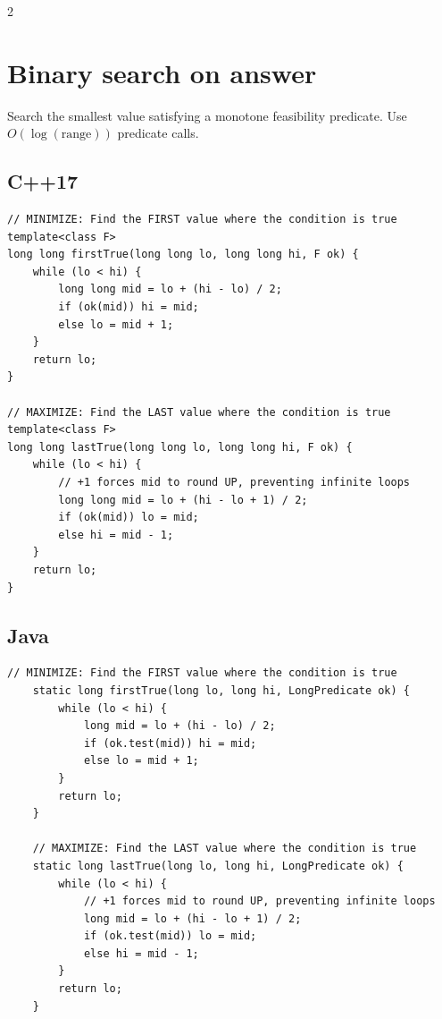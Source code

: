 \documentclass[10pt]{article}
\begin{document}
\begin{multicols}{2}

\section{Binary search on answer}
Search the smallest value satisfying a monotone feasibility predicate.
Use $O(\log(\mathrm{range}))$ predicate calls.

\subsection{C++17}
\begin{framed}
\scriptsize
\begin{verbatim}
// MINIMIZE: Find the FIRST value where the condition is true
template<class F>
long long firstTrue(long long lo, long long hi, F ok) {
    while (lo < hi) {
        long long mid = lo + (hi - lo) / 2;
        if (ok(mid)) hi = mid;
        else lo = mid + 1;
    }
    return lo;
}

// MAXIMIZE: Find the LAST value where the condition is true
template<class F>
long long lastTrue(long long lo, long long hi, F ok) {
    while (lo < hi) {
        // +1 forces mid to round UP, preventing infinite loops
        long long mid = lo + (hi - lo + 1) / 2;
        if (ok(mid)) lo = mid;
        else hi = mid - 1;
    }
    return lo;
}
\end{verbatim}
\end{framed}

\subsection{Java}
\begin{framed}
\scriptsize
\begin{verbatim}
// MINIMIZE: Find the FIRST value where the condition is true
    static long firstTrue(long lo, long hi, LongPredicate ok) {
        while (lo < hi) {
            long mid = lo + (hi - lo) / 2;
            if (ok.test(mid)) hi = mid;
            else lo = mid + 1;
        }
        return lo;
    }

    // MAXIMIZE: Find the LAST value where the condition is true
    static long lastTrue(long lo, long hi, LongPredicate ok) {
        while (lo < hi) {
            // +1 forces mid to round UP, preventing infinite loops
            long mid = lo + (hi - lo + 1) / 2;
            if (ok.test(mid)) lo = mid;
            else hi = mid - 1;
        }
        return lo;
    }
\end{verbatim}
\end{framed}


\end{multicols}
\end{document}
